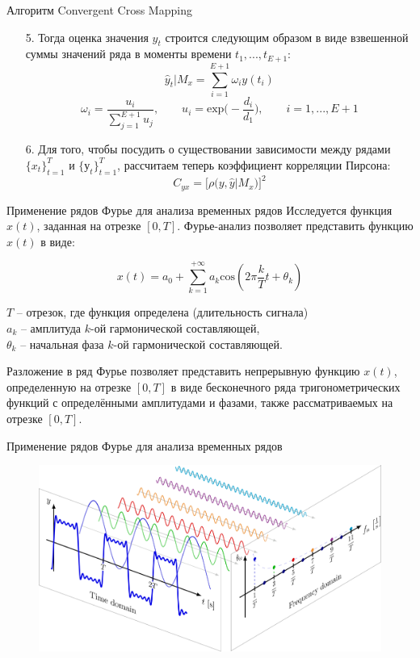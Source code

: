 \begin{frame}{Алгоритм Convergent Cross Mapping}

\begin{enumerate}

    \item[5.] Тогда оценка значения $y_t$ строится следующим образом в виде взвешенной суммы значений ряда в моменты времени $t_1, ..., t_{E+1}$:
    $$ \hat{y}_t|M_x = \sum_{i=1}^{E+1} \omega_i y(t_i)$$
    $$ \omega_i = \frac{u_i}{\displaystyle \sum_{j=1}^{E + 1}u_j}, \quad \quad u_i = \text{exp}\Big(-\frac{d_i}{d_1}\Big), \quad \quad i = 1, ..., E+1$$
    \item[6.] Для того, чтобы посудить о существовании зависимости между рядами $\{x_t\}_{t=1}^T$ и $\{у_t\}_{t=1}^T$, рассчитаем теперь коэффициент корреляции Пирсона:
    $$ C_{yx} = \Bigg[\rho \Big( y, \hat{y}|M_x \Big) \Bigg]^2$$

\end{enumerate}

\end{frame}
\begin{frame}{Применение рядов Фурье для анализа временных рядов}
Исследуется функция $x(t)$, заданная на отрезке $[0, T]$.\newline
Фурье-анализ позволяет представить функцию $x(t)$ в виде:

$$x(t) = a_0 + \sum_{k=1}^{+\infty}a_k \text{cos}(2\pi\frac{k}{T}t + \theta_k)$$

$T$ -- отрезок, где функция определена (длительность сигнала)\\
$a_k$ -- амплитуда $k$-ой гармонической составляющей,\\
$\theta_k$ -- начальная фаза $k$-ой гармонической составляющей.
\vspace{0.5cm}

Разложение в ряд Фурье позволяет представить непрерывную функцию $x(t)$, определенную на отрезке $[0, T]$ в виде бесконечного ряда тригонометрических функций с определёнными амплитудами и фазами, также рассматриваемых на отрезке $[0, T]$.

\end{frame}
\begin{frame}{Применение рядов Фурье для анализа временных рядов}
\begin{figure}
    \centering
    \includegraphics[width=\textwidth]{lecture_5/figs/fourier_series_2.png}
\end{figure}
\end{frame}
